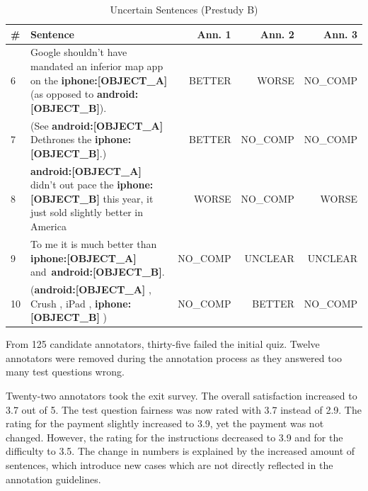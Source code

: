 \begin{table}[h]
\centering
\caption{Uncertain Sentences (Prestudy B)}
\label{tbl:pre_2_res}
\begin{tabularx}{\textwidth}{lXrrr}
\toprule
\# & Sentence        & Ann. 1  & Ann. 2 & Ann. 3             \\ \midrule
6 & Google shouldn't have mandated an inferior map app on the \textbf{{\color[HTML]{9A14B2}iphone:{[}OBJECT\_A{]}}} (as opposed to \textbf{{\color[HTML]{6CB219}android:{[}OBJECT\_B{]}}}). & BETTER & WORSE & NO\_COMP \\
7 & (See \textbf{{\color[HTML]{9A14B2}android:{[}OBJECT\_A{]}}} Dethrones the \textbf{{\color[HTML]{6CB219} iphone:{[}OBJECT\_B{]}}}.) & BETTER & NO\_COMP & NO\_COMP \\

8 & \textbf{{\color[HTML]{9A14B2}android:{[}OBJECT\_A{]}}} didn't out pace the \textbf{{\color[HTML]{6CB219} iphone:{[}OBJECT\_B{]}}} this year, it just sold slightly better in America & WORSE & NO\_COMP & WORSE\\

9 & To me it is much better than \textbf{{\color[HTML]{9A14B2}iphone:{[}OBJECT\_A{]}}} \mbox{and \textbf{{\color[HTML]{6CB219}android:{[}OBJECT\_B{]}}}}. & NO\_COMP & UNCLEAR & UNCLEAR \\

10 & (\textbf{{\color[HTML]{9A14B2}android:{[}OBJECT\_A{]}}} , Crush , iPad , \mbox{\textbf{{\color[HTML]{6CB219}iphone:{[}OBJECT\_B{]}}}} )& NO\_COMP & BETTER & NO\_COMP \\

\bottomrule                              
\end{tabularx}
\end{table}


From 125 candidate annotators, thirty-five failed the initial quiz. Twelve annotators were removed during the annotation process as they answered too many test questions wrong.

Twenty-two annotators took the exit survey. The overall satisfaction increased to 3.7 out of 5. The test question fairness was now rated with 3.7  instead of 2.9. The rating for the payment slightly increased to 3.9, yet the payment was not changed. However, the rating for the instructions decreased to 3.9 and for the difficulty to 3.5.
The change in numbers is explained by the increased amount of sentences, which introduce new cases which are not directly reflected in the annotation guidelines.
 
